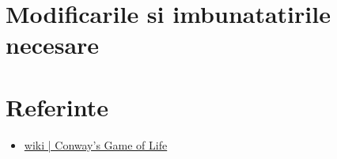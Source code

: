 \documentclass[11pt ,A4]{article}
\begin{document}
    \section{Modificarile si imbunatatirile necesare}

    \section{Referinte}

        \begin{itemize}
            \item \href{https://en.wikipedia.org/wiki/Conway%27s_Game_of_Life}{wiki | Conway's Game of Life}
        \end{itemize}
\end{document}
